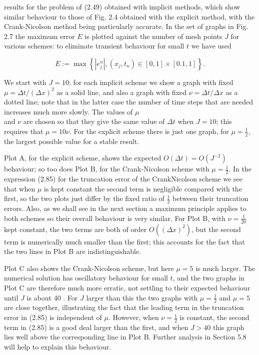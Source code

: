 \documentclass[10pt]{article}
\begin{document}
results for the problem of (2.49) obtained with implicit methods, which show similar behaviour to those of Fig. 2.4 obtained with the explicit method, with the Crank-Nicolson method being particularly accurate. In the set of graphs in Fig. 2.7 the maximum error \(E\) is plotted against the number of mesh points \(J\) for various schemes: to eliminate transient behaviour for small \(t\) we have used

\[
E:=\max \left\{\left|e_{j}^{n}\right|,\left(x_{j}, t_{n}\right) \in[0,1] \times[0.1,1]\right\} .
\]

We start with \(J=10\); for each implicit scheme we show a graph with fixed \(\mu=\Delta t /(\Delta x)^{2}\) as a solid line, and also a graph with fixed \(\nu=\Delta t / \Delta x\) as a dotted line; note that in the latter case the number of time steps that are needed increases much more slowly. The values of \(\mu\)\\
and \(\nu\) are chosen so that they give the same value of \(\Delta t\) when \(J=10\); this requires that \(\mu=10 \nu\). For the explicit scheme there is just one graph, for \(\mu=\frac{1}{2}\), the largest possible value for a stable result.

Plot A, for the explicit scheme, shows the expected \(O(\Delta t)=O\left(J^{-2}\right)\) behaviour; so too does Plot B, for the Crank-Nicolson scheme with \(\mu=\frac{1}{2}\). In the expression (2.85) for the truncation error of the CrankNicolson scheme we see that when \(\mu\) is kept constant the second term is negligible compared with the first, so the two plots just differ by the fixed ratio of \(\frac{1}{2}\) between their truncation errors. Also, as we shall see in the next section a maximum principle applies to both schemes so their overall behaviour is very similar. For Plot B, with \(\nu=\frac{1}{20}\) kept constant, the two terms are both of order \(O\left((\Delta x)^{2}\right)\), but the second term is numerically much smaller than the first; this accounts for the fact that the two lines in Plot B are indistinguishable.

Plot C also shows the Crank-Nicolson scheme, but here \(\mu=5\) is much larger. The numerical solution has oscillatory behaviour for small \(t\), and the two graphs in Plot C are therefore much more erratic, not settling to their expected behaviour until \(J\) is about 40 . For \(J\) larger than this the two graphs with \(\mu=\frac{1}{2}\) and \(\mu=5\) are close together, illustrating the fact that the leading term in the truncation error in (2.85) is independent of \(\mu\). However, when \(\nu=\frac{1}{2}\) is constant, the second term in (2.85) is a good deal larger than the first, and when \(J>40\) this graph lies well above the corresponding line in Plot B. Further analysis in Section 5.8 will help to explain this behaviour.
\end{document}

